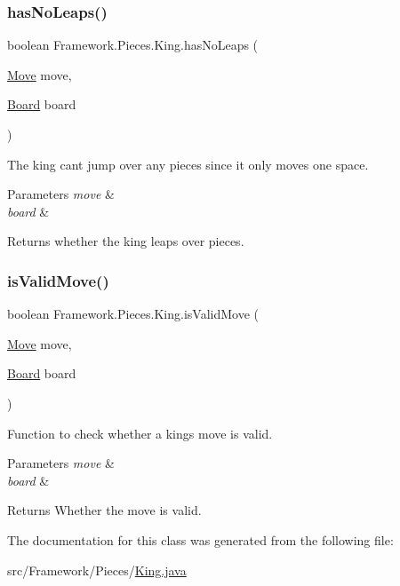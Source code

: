 \subsubsection{\texorpdfstring{has\+No\+Leaps()}{hasNoLeaps()}}
{\footnotesize\ttfamily boolean Framework.\+Pieces.\+King.\+has\+No\+Leaps (\begin{DoxyParamCaption}\item[{\hyperlink{class_framework_1_1_move}{Move}}]{move,  }\item[{\hyperlink{class_framework_1_1_board}{Board}}]{board }\end{DoxyParamCaption})}

The king can\textquotesingle{}t jump over any pieces since it only moves one space. 
\begin{DoxyParams}{Parameters}
{\em move} & \\
\hline
{\em board} & \\
\hline
\end{DoxyParams}
\begin{DoxyReturn}{Returns}
whether the king leaps over pieces. 
\end{DoxyReturn}
\hypertarget{class_framework_1_1_pieces_1_1_king_a69de9389a669add555f34a8dd8e24a9f}{}\label{class_framework_1_1_pieces_1_1_king_a69de9389a669add555f34a8dd8e24a9f} 
\subsubsection{\texorpdfstring{is\+Valid\+Move()}{isValidMove()}}
{\footnotesize\ttfamily boolean Framework.\+Pieces.\+King.\+is\+Valid\+Move (\begin{DoxyParamCaption}\item[{\hyperlink{class_framework_1_1_move}{Move}}]{move,  }\item[{\hyperlink{class_framework_1_1_board}{Board}}]{board }\end{DoxyParamCaption})}

Function to check whether a king\textquotesingle{}s move is valid. 
\begin{DoxyParams}{Parameters}
{\em move} & \\
\hline
{\em board} & \\
\hline
\end{DoxyParams}
\begin{DoxyReturn}{Returns}
Whether the move is valid. 
\end{DoxyReturn}


The documentation for this class was generated from the following file\+:\begin{DoxyCompactItemize}
\item 
src/\+Framework/\+Pieces/\hyperlink{_king_8java}{King.\+java}\end{DoxyCompactItemize}
